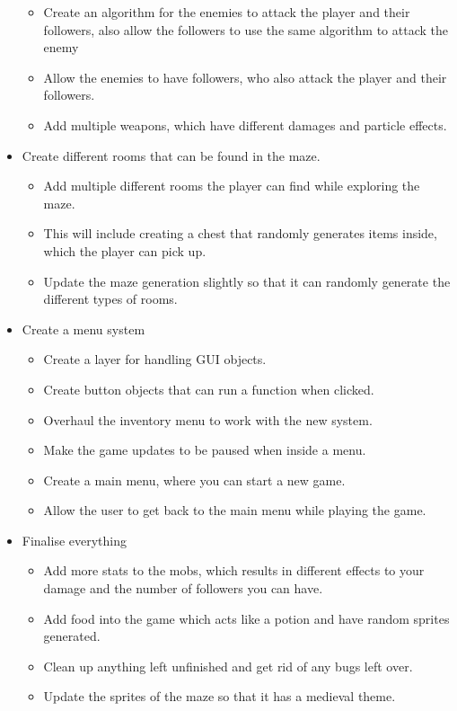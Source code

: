 \documentclass[../Main.tex]{subfiles}
\begin{document}
\begin{itemize}
\begin{itemize}
                    \item Create an algorithm for the enemies to attack the player and their followers, also allow the followers to use the same algorithm to attack the enemy
                    \item Allow the enemies to have followers, who also attack the player and their followers.
                    \item Add multiple weapons, which have different damages and particle effects.
                \end{itemize}
            \item Create different rooms that can be found in the maze.
                \begin{itemize}
                    \item Add multiple different rooms the player can find while exploring the maze.
                    \item This will include creating a chest that randomly generates items inside, which the player can pick up.
                    \item Update the maze generation slightly so that it can randomly generate the different types of rooms.
                \end{itemize}
            \item Create a menu system
                \begin{itemize}
                    \item Create a layer for handling GUI objects.
                    \item Create button objects that can run a function when clicked.
                    \item Overhaul the inventory menu to work with the new system.
                    \item Make the game updates to be paused when inside a menu.
                    \item Create a main menu, where you can start a new game.
                    \item Allow the user to get back to the main menu while playing the game.
                \end{itemize}
            \item Finalise everything
                \begin{itemize}
                    \item Add more stats to the mobs, which results in different effects to your damage and the number of followers you can have.
                    \item Add food into the game which acts like a potion and have random sprites generated.
                    \item Clean up anything left unfinished and get rid of any bugs left over.
                    \item Update the sprites of the maze so that it has a medieval theme.
                \end{itemize}
        \end{itemize}
\end{document}
